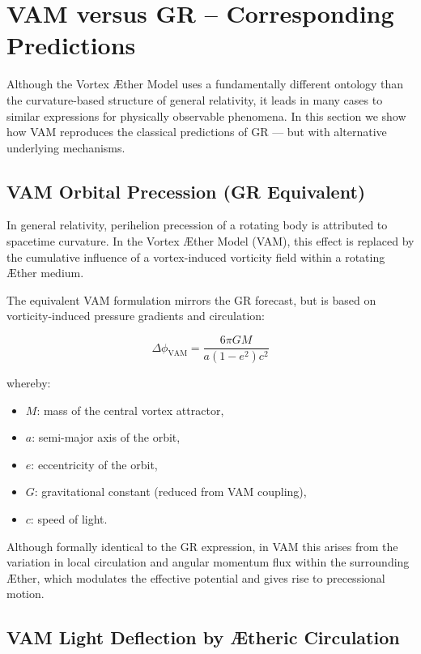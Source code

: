\section{VAM versus GR – Corresponding Predictions}\label{sec:vam-versus-gr--corresponding-predictions}

Although the Vortex Æther Model uses a fundamentally different ontology than the curvature-based structure of general relativity, it leads in many cases to similar expressions for physically observable phenomena. In this section we show how VAM reproduces the classical predictions of GR — but with alternative underlying mechanisms.

\subsection*{VAM Orbital Precession (GR Equivalent)}

In general relativity, perihelion precession of a rotating body is attributed to spacetime curvature. In the Vortex Æther Model (VAM), this effect is replaced by the cumulative influence of a vortex-induced vorticity field within a rotating Æther medium.

The equivalent VAM formulation mirrors the GR forecast, but is based on vorticity-induced pressure gradients and circulation:

\begin{equation}
    \Delta\phi_{\text{VAM}} =
    \frac{6\pi G M}{a(1 - e^2) c^2}
\end{equation}

whereby:
\begin{itemize}
    \item \( M \): mass of the central vortex attractor,
    \item \( a \): semi-major axis of the orbit,
    \item \( e \): eccentricity of the orbit,
    \item \( G \): gravitational constant (reduced from VAM coupling),
    \item \( c \): speed of light.
\end{itemize}
Although formally identical to the GR expression, in VAM this arises from the variation in local circulation and angular momentum flux within the surrounding Æther, which modulates the effective potential and gives rise to precessional motion.

\subsection*{VAM Light Deflection by Ætheric Circulation}


